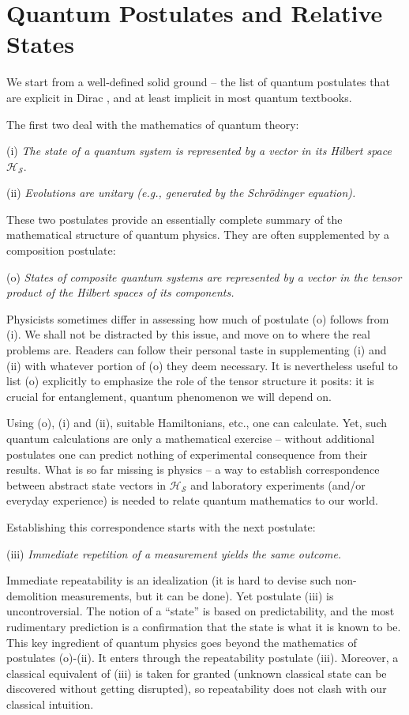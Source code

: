 \documentclass[aps,amsmath,amssymb,amsfonts,12pt]{revtex4-1}
\newcommand{\cH}        {{\mathcal H}}
\newcommand{\cS}        {{\mathcal S}}
\newcommand{\+}         {\dagger}
\begin{document}
\section{Quantum Postulates and Relative States}

We start from a well-defined solid ground -- the
list of quantum postulates that are explicit in Dirac \cite{11}, and at least implicit in most quantum textbooks.

The first two deal with the mathematics of quantum theory:

(i) {\it The state of a quantum system is represented by a vector in its Hilbert space} $\cH_{\cS}$.

(ii) {\it Evolutions are unitary (e.g., generated by the Schr\"odinger equation).}

These two postulates provide an essentially complete summary of the mathematical structure of quantum physics.
They are often \cite{21,22} supplemented by a composition postulate: 

(o) {\it States of composite quantum systems are represented by a vector in the tensor product of the Hilbert spaces of its components.}

Physicists sometimes differ in assessing how much of postulate (o) follows from (i).
We shall not be distracted by this issue, and move on to where the real problems are.  Readers
can follow their personal taste in supplementing (i) and (ii) with whatever portion of (o) they deem
necessary. It is nevertheless useful to list (o) explicitly to emphasize the role of the tensor structure it posits: it is crucial for entanglement, quantum phenomenon we will depend on.

Using (o), (i) and (ii), suitable Hamiltonians, etc., one can calculate. Yet, such quantum calculations are only a mathematical exercise 
-- without additional postulates one can predict nothing of experimental consequence from their results. What is so far missing is physics -- a way to establish correspondence 
between abstract state vectors in $\cH_{\cS}$ and laboratory experiments 
(and/or everyday experience) is needed to relate quantum mathematics to our world. 

Establishing this correspondence starts with the next postulate:

(iii) {\it Immediate repetition of a measurement yields the same outcome.}

Immediate repeatability is an idealization (it is hard to devise such non-demolition measurements, but it
can be done). Yet postulate (iii) is uncontroversial. The notion of a ``state'' is based on predictability, and the most rudimentary prediction is 
a confirmation that the state is what it is known to be. This key ingredient of quantum physics goes beyond the mathematics of postulates (o)-(ii). It enters through the repeatability postulate (iii). Moreover, a classical equivalent of 
(iii) is taken for granted (unknown classical state can be discovered without getting disrupted), so repeatability does not clash with our classical intuition.
\end{document}
